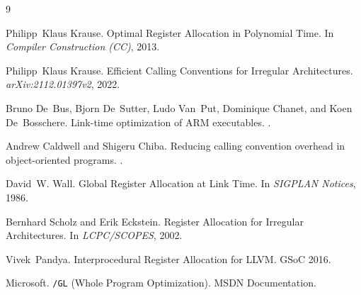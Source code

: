 \documentclass[sigplan,screen,nonacm]{acmart}
\begin{document}


\begin{thebibliography}{9}

Philipp~Klaus Krause.
\newblock Optimal Register Allocation in Polynomial Time.
\newblock In \emph{Compiler Construction (CC)}, 2013.

Philipp~Klaus Krause.
\newblock Efficient Calling Conventions for Irregular Architectures.
\newblock \emph{arXiv:2112.01397v2}, 2022.

Bruno De~Bus, Bjorn De~Sutter, Ludo Van~Put, Dominique Chanet, and
  Koen De~Bosschere.
\newblock Link-time optimization of ARM executables.
.

Andrew Caldwell and Shigeru Chiba.
\newblock Reducing calling convention overhead in object-oriented programs.
.

David~W. Wall.
\newblock Global Register Allocation at Link Time.
\newblock In \emph{SIGPLAN Notices}, 1986.

Bernhard Scholz and Erik Eckstein.
\newblock Register Allocation for Irregular Architectures.
\newblock In \emph{LCPC/SCOPES}, 2002.

Vivek~Pandya.
\newblock Interprocedural Register Allocation for LLVM.
\newblock GSoC 2016.

Microsoft.
\newblock \texttt{/GL} (Whole Program Optimization).
\newblock MSDN Documentation.

\end{thebibliography}
\end{document}
